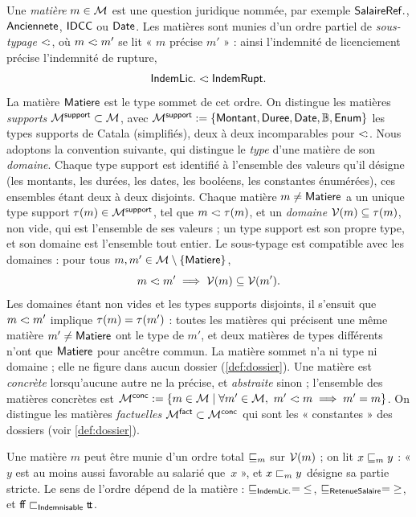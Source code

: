\documentclass[review]{jflart}
\begin{document}
\begin{defi}\label{def:matiere}
Une \emph{matière} \(m\in\mathcal{M}\) est une question juridique nommée, par
exemple \(\mathsf{SalaireRef.}\), \(\mathsf{Anciennete}\), \(\mathsf{IDCC}\) ou \(\mathsf{Date}\). Les matières sont
munies d'un ordre partiel de \emph{sous-typage} \(\mathrel{<\!:}\), où
\(m\mathrel{<\!:} m'\) se lit « \(m\) précise \(m'\) » : ainsi l'indemnité de
licenciement précise l'indemnité de rupture,
\[
 \mathsf{IndemLic.}\mathrel{<\!:}\mathsf{IndemRupt.}
\]
La matière \(\mathsf{Matiere}\) est le type sommet de cet ordre. On distingue les
matières \emph{supports} $\mathcal{M}^{\mathsf{support}}\subset\mathcal{M}$, avec
$\mathcal{M}^{\mathsf{support}}:=\{\mathsf{Montant},\mathsf{Duree},\mathsf{Date},\mathbb{B},\mathsf{Enum}\}$ les types supports
de Catala (simplifiés), deux à deux incomparables pour \(\mathrel{<\!:}\). Nous
adoptons la convention suivante, qui distingue le \emph{type} d'une matière de
son \emph{domaine}. Chaque type support est identifié à l'ensemble des valeurs
qu'il désigne (les montants, les durées, les dates, les booléens, les
constantes énumérées), ces ensembles étant deux à deux disjoints. Chaque
matière \(m\neq\mathsf{Matiere}\) a un unique type support \(\tau(m)\in\mathcal{M}^{\mathsf{support}}\),
tel que \(m\mathrel{<\!:}\tau(m)\), et un \emph{domaine} \(\mathcal{V}(m)\subseteq\tau(m)\),
non vide, qui est l'ensemble de ses valeurs ; un type support est son propre
type, et son domaine est l'ensemble tout entier. Le sous-typage est compatible
avec les domaines : pour tous \(m,m'\in\mathcal{M}\setminus\{\mathsf{Matiere}\}\),
\[
 m\mathrel{<\!:} m'\implies\mathcal{V}(m)\subseteq\mathcal{V}(m').
\]
Les domaines étant non vides et les types supports disjoints, il s'ensuit que
\(m\mathrel{<\!:} m'\) implique \(\tau(m)=\tau(m')\) : toutes les matières qui
précisent une même matière \(m'\neq\mathsf{Matiere}\) ont le type de \(m'\), et deux
matières de types différents n'ont que \(\mathsf{Matiere}\) pour ancêtre commun. La
matière sommet n'a ni type ni domaine ; elle ne figure dans aucun dossier
(\autoref{def:dossier}).
Une matière est \emph{concrète} lorsqu'aucune autre ne la précise, et
\emph{abstraite} sinon ; l'ensemble des matières concrètes est \(
 \CMatter:=\{m\in\mc M\mid\forall m'\in\mc M,\ m'\subtype m\implies m'=m\}\).
On distingue les matières \emph{factuelles} $\mathcal{M}^{\mathsf{fact}}\subset\mathcal{M}^{\mathsf{conc}}$ qui sont les « constantes » des dossiers (voir \autoref{def:dossier}).
\end{defi}

\begin{defi}\label{def:favorable}
Une matière \(m\) peut être munie d'un ordre total \(\mathrel{\sqsubseteq_{m}}\) sur
\(\mathcal{V}(m)\) ;
on lit \(x\mathrel{\sqsubseteq_{m}}y\) : « \(y\) est au moins aussi favorable au salarié
que~\(x\) », et \(x\mathrel{\sqsubset_{m}}y\) désigne sa partie stricte. Le sens de
l'ordre dépend de la matière :
\(\mathrel{\sqsubseteq_{\mathsf{IndemLic.}}}=\mathord{\leq}\),
\(\mathrel{\sqsubseteq_{\mathsf{RetenueSalaire}}}=\mathord{\geq}\), et
\({\mathsf{f\!f}}\mathrel{\sqsubset_{\mathsf{Indemnisable}}}{\mathsf{t\!t}}\).
\end{defi}
\end{document}
